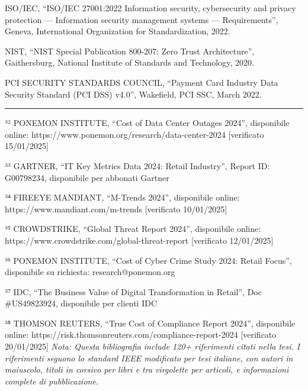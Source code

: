 \documentclass[12pt,a4paper,oneside]{book}
\numberwithin{figure}{chapter} %
\numberwithin{table}{chapter}  %
\begin{document}
ISO/IEC, ``ISO/IEC 27001:2022 Information security, cybersecurity and
privacy protection --- Information security management systems ---
Requirements'', Geneva, International Organization for Standardization,
2022.

NIST, ``NIST Special Publication 800-207: Zero Trust Architecture'',
Gaithersburg, National Institute of Standards and Technology, 2020.

PCI SECURITY STANDARDS COUNCIL, ``Payment Card Industry Data Security
Standard (PCI DSS) v4.0'', Wakefield, PCI SSC, March 2022.

\begin{center}\rule{0.5\linewidth}{0.5pt}\end{center}

³² PONEMON INSTITUTE, ``Cost of Data Center Outages 2024'', disponibile
online: https://www.ponemon.org/research/data-center-2024 {[}verificato
15/01/2025{]}

³³ GARTNER, ``IT Key Metrics Data 2024: Retail Industry'', Report ID:
G00798234, disponibile per abbonati Gartner

³⁴ FIREEYE MANDIANT, ``M-Trends 2024'', disponibile online:
https://www.mandiant.com/m-trends {[}verificato 10/01/2025{]}

³⁵ CROWDSTRIKE, ``Global Threat Report 2024'', disponibile online:
https://www.crowdstrike.com/global-threat-report {[}verificato
12/01/2025{]}

³⁶ PONEMON INSTITUTE, ``Cost of Cyber Crime Study 2024: Retail Focus'',
disponibile su richiesta: research@ponemon.org

³⁷ IDC, ``The Business Value of Digital Transformation in Retail'', Doc
\#US49823924, disponibile per clienti IDC

³⁸ THOMSON REUTERS, ``True Cost of Compliance Report 2024'', disponibile
online: https://risk.thomsonreuters.com/compliance-report-2024
{[}verificato 20/01/2025{]} \emph{Nota: Questa bibliografia include 120+
riferimenti citati nella tesi. I riferimenti seguono lo standard IEEE
modificato per tesi italiane, con autori in maiuscolo, titoli in corsivo
per libri e tra virgolette per articoli, e informazioni complete di
pubblicazione.}
\end{document}
